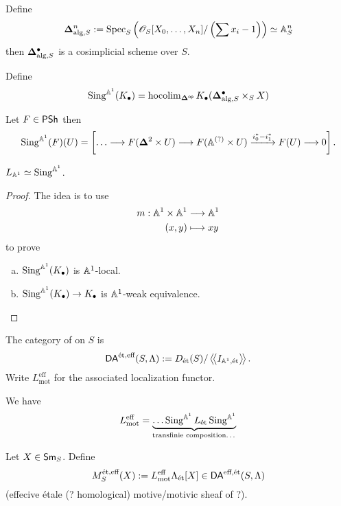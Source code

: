 \begin{definition}
Define
\[
\mathbf{\Delta}^{n}_{\text{alg},S} := \operatorname{Spec}_S\left( \mathscr{O}_S[X_0,\dots,X_n] / \left( \sum
x_i-1 \right)  \right) \simeq \mathbb A_S^{n}
\]
then $\mathbf{\Delta}_{\text{alg},S}^{\bullet}$ is a cosimplicial scheme over $S$.
\end{definition}
\begin{definition}
Define
\[
\operatorname{Sing}^{\mathbb A^{1}}(K_\bullet) = \operatorname{hocolim}_{\mathbf{\Delta}^\mathsf{op}}
K_\bullet(\mathbf{\Delta}_{\text{alg},S}^{\bullet}\times_S X)
\]
\end{definition}
\begin{example}
Let $F\in \mathsf{PSh}$ then
\[
\Sing^{\Aff^{1}}(F)(U) = \left[ \dots \to  F(\bb{\Delta}^2\times U)\to F(\Aff^{(?)}\times
U) \xrightarrow{i_0^{*}-i_1^{*}}  F(U) \to 0 \right] .
\] 	
\end{example}
\begin{proposition}
$L_{\mathbb A^{1}}\simeq \operatorname{Sing}^{\mathbb A^{1}}$.
\end{proposition}
\begin{proof}
The idea is to use
\begin{align*}
m: \mathbb A^{1}\times \mathbb A^{1} &\longrightarrow \mathbb A^{1} \\
(x,y) &\longmapsto xy
\end{align*}
to prove
\begin{enumerate}[a)]
\item $\operatorname{Sing}^{\mathbb A^{1}}(K_\bullet)$ is $\mathbb A^{1}$-local.
\item $\Sing^{\Aff^{1}}(K_\bullet)\to K_\bullet$ is $\mathbb A^{1}$-weak equivalence.
\end{enumerate}
\end{proof}
\begin{definition}
The category of  on $S$ is
\[
\mathsf{DA}^{\text{\'et},\text{eff}}(S,\Lambda) := D_{\text{\'et}}(S) /
\left\langle\!\left\langle I_{\mathbb A^{1},\text{\'et}} \right\rangle\!\right\rangle.
\]
Write $L_{\text{mot}}^{\text{eff}}$ for the associated localization functor.
\end{definition}
\begin{lemma}
We have
\[
L_{\text{mot}}^{\text{eff}} = \underbrace{\dots
\operatorname{Sing}^{\mathbb A^{1}}L_{\text{\'et}}\operatorname{Sing}^{\mathbb A^{1}}}_{\text{transfinie composition\dots}}
\]
\end{lemma}
\begin{definition}
Let $X\in \mathsf{Sm}_S$. Define
\[
M_S^{\text{\'et},\text{eff}}(X) :=
L_{\text{mot}}^{\text{eff}}\Lambda_{\text{\'et}}[X]\in \mathsf{DA}^{\text{eff},\text{\'et}}(S,\Lambda)
\]
(effecive \'etale (? homological) motive/motivic sheaf of ?).
\end{definition}
